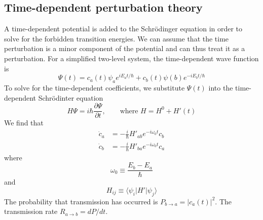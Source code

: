 \subsection{Time-dependent perturbation theory}

A time-dependent potential is added to the Schr\"{o}dinger equation in order to 
solve for the forbidden transition energies.  We can assume that the time 
perturbation is a minor component of the potential and can thus treat it as a 
perturbation.  For a simplified two-level system, the time-dependent wave 
function is
\begin{equation}
    \Psi (t) = c_a (t) \psi_a e^{iE_a t/\hbar} + c_b (t) \psi (b) e^{-iE_b t/\hbar}
\end{equation}
To solve for the time-dependent coefficients, we substitute $\Psi (t)$ into the 
time-dependent Schr\"{o}dinter equation
\begin{equation}
    H\Psi = i\hbar \frac{\partial \Psi}{\partial t}, \qquad \text{where } H = H^0 + H'(t)
\end{equation}
We find that
\begin{align}
    \dot{c}_a &= -\frac{i}{\hbar} H'_{ab} e^{-i\omega_0 t} c_b\\
    \dot{c}_b &= -\frac{i}{\hbar} H'_{ba} e^{-i\omega_0 t} c_a
\end{align}
where
\begin{equation}
    \omega_0 \equiv \frac{E_b - E_a}{\hbar}
\end{equation}
and
\begin{equation}
    H_{ij} \equiv \langle \psi_i | H' | \psi_j \rangle
\end{equation}
The probability that transmission has occurred is $P_{b\to a} = |c_a (t)|^2$.  
The transmission rate $R_{a\to b} = dP/dt$.

